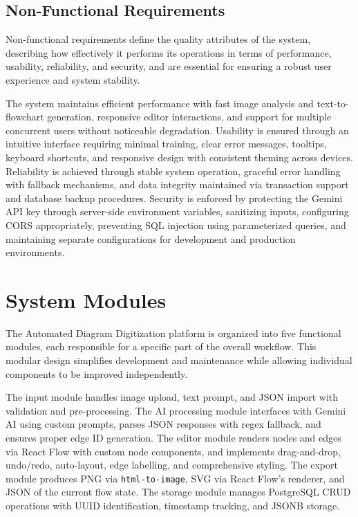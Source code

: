 \subsection{Non-Functional Requirements}
\label{sec:nonfunctional-req}

Non-functional requirements define the quality attributes of the 
system, describing how effectively it performs its operations in 
terms of performance, usability, reliability, and security, and are 
essential for ensuring a robust user experience and system stability.

The system maintains efficient performance with fast image analysis 
and text-to-flowchart generation, responsive editor interactions, 
and support for multiple concurrent users without noticeable 
degradation. Usability is ensured through an intuitive interface 
requiring minimal training, clear error messages, tooltips, keyboard 
shortcuts, and responsive design with consistent theming across 
devices. Reliability is achieved through stable system operation, 
graceful error handling with fallback mechanisms, and data integrity 
maintained via transaction support and database backup procedures. 
Security is enforced by protecting the Gemini API key through 
server-side environment variables, sanitizing inputs, configuring 
CORS appropriately, preventing SQL injection using parameterized 
queries, and maintaining separate configurations for development 
and production environments.

\section{System Modules}
\label{sec:system-modules}

The Automated Diagram Digitization platform is organized into five 
functional modules, each responsible for a specific part of the 
overall workflow. This modular design simplifies development and 
maintenance while allowing individual components to be improved 
independently.

The input module handles image upload, text prompt, and JSON import with validation and pre-processing. The AI processing module interfaces with Gemini AI using custom prompts, parses JSON responses with regex fallback, and ensures proper edge ID generation. The editor module renders nodes and edges via React Flow with custom node components, and implements drag-and-drop, undo/redo, auto-layout, edge labelling, and comprehensive styling. The export module produces PNG via \texttt{html-to-image}, SVG via React Flow's renderer, and JSON of the current flow state. The storage module manages PostgreSQL CRUD operations with UUID identification, timestamp tracking, and JSONB storage.

